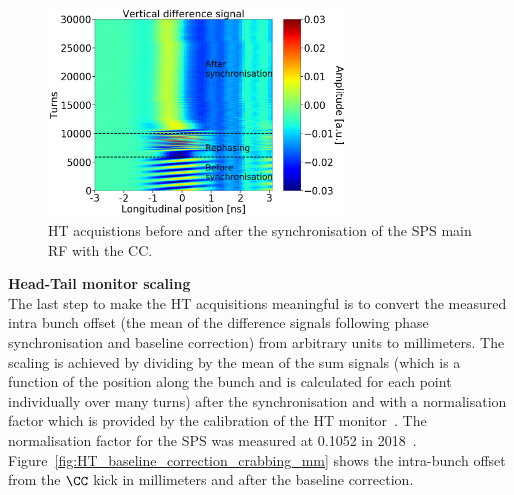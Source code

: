 \begin{figure}[!h]
   \centering         
   \includegraphics[width=0.7\textwidth]{images/Ch4/HT_2D__20180530_135105_before_after_sunchronisation_new_version_CC_post_processing.png}
       \caption{HT acquistions before and after the synchronisation of the SPS main RF with the CC.}
       \label{fig:HT_baseline_correction_measurements_2D}
\end{figure}


\normalsize{\textbf{Head-Tail monitor scaling}}\\
The last step to make the HT acquisitions meaningful is to convert the measured intra bunch offset (the mean of the difference signals following phase synchronisation and baseline correction) from arbitrary units to millimeters. The scaling is achieved by dividing by the mean of the sum signals (which is a function of the position along the bunch and is calculated for each point individually over many turns) after the synchronisation and with a normalisation factor which is provided by the calibration of the HT monitor~\cite{PhysRevAccelBeams.22.112803}. The normalisation factor for the SPS was measured at 0.1052 in 2018~\cite{HT_calibration_2018}. Figure~\ref{fig:HT_baseline_correction_crabbing_mm} shows the intra-bunch offset from the $\CC$ kick in millimeters and after the baseline correction. 

